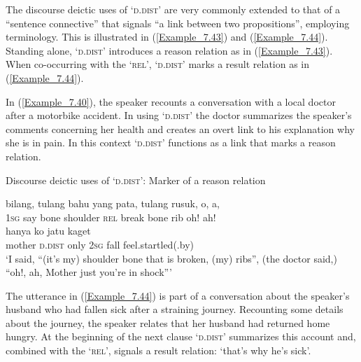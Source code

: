{The discourse deictic uses of  ‘\textsc{d.dist}’ are very commonly extended to that of a “sentence connective” that signals “a  link between two propositions”, employing  terminology. This is illustrated in (\ref{Example_7.43}) and (\ref{Example_7.44}). Standing alone,  ‘\textsc{d.dist}’ introduces a reason relation as in (\ref{Example_7.43}). When co-occurring with the   ‘\textsc{rel}’,  ‘\textsc{d.dist}’ marks a result relation as in (\ref{Example_7.44}).



In (\ref{Example_7.40}), the speaker recounts a conversation with a local doctor after a motorbike accident. In using  ‘\textsc{d.dist}’ the doctor summarizes the speaker’s comments concerning her health and creates an overt link to his explanation why she is in pain. In this context  ‘\textsc{d.dist}’ functions as a  link that marks a reason relation.


\begin{styleExampleTitle}
Discourse deictic uses of  ‘\textsc{d.dist}’: Marker of a reason relation
\end{styleExampleTitle}

\ea
\label{Example_7.43}
 {{bilang,}} {{tulang}} {{bahu}} {{yang}} {pata,} {tulang} {rusuk,} {o,} {a,}\\ %
 \textsc{1sg}  {say}  {bone}  {shoulder}  {\textsc{rel}}  break  bone  rib  oh!  ah!\\
  {}  {hanya}  ko  {jatu}  {kaget}\\
 {mother}  {\textsc{d.dist}}  {only}  \textsc{2sg}  {fall}  {feel.startled(.by)}\\
\glt 
‘I said, ``(it’s my) shoulder bone that is broken, (my) ribs'', (the doctor said,) ``oh!, ah, Mother  just  you’re in shock''' \textstyleExampleSource{[081015-005-NP.0048]}
\z



The utterance in (\ref{Example_7.44}) is part of a conversation about the speaker’s husband who had fallen sick after a straining journey. Recounting some details about the journey, the speaker relates that her husband had returned home hungry. At the beginning of the next clause  ‘\textsc{d.dist}’ summarizes this account and, combined with the   ‘\textsc{rel}’, signals a result relation:  ‘that’s why he’s sick’.


}
